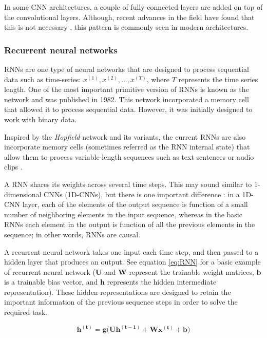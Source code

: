In some CNN architectures, a couple of fully-connected layers are added on top of the convolutional layers. Although, recent advances in the field have found that this is not necessary \autocite{shelhamer2015}, this pattern is commonly seen in modern architectures.


\subsubsection{Recurrent neural networks}
\sloppy RNNs are one type of neural networks that are designed to process sequential data such as time-series: $x^{(1)}, x^{(2)}, ..., x^{(T)}$, where $T$ represents the time series length. One of the most important primitive version of RNNs is known as the \citet{hopfield1982} network and was published in 1982. This network incorporated a memory cell that allowed it to process sequential data. However, it was initially designed to work with binary data.

Inspired by the \textit{Hopfield} network and its variants, the current RNNs are also incorporate memory cells (sometimes referred as the RNN internal state) that allow them to process variable-length sequences such as text sentences or audio clips \autocite{haykin1998}.

A RNN shares its weights across several time steps. This may sound similar to 1-dimensional CNNs (1D-CNNs), but there is one important difference \autocite{Goodfellow2016}: in a 1D-CNN layer, each of the elements of the output sequence is function of a small number of neighboring elements in the input sequence, whereas in the basic RNNs each element in the output is function of all the previous elements in the sequence; in other words, RNNs are causal. 

A recurrent neural network takes one input each time step, and then passed to a hidden layer that produces an output. See equation \ref{eq:RNN} for a basic example of recurrent neural network ($\mathbf{U}$ and $\mathbf{W}$ represent the trainable weight matrices, $\mathbf{b}$ is a trainable bias vector, and $\mathbf{h}$ represents the hidden intermediate representation). These hidden representations are designed to retain the important information of the previous sequence steps in order to solve the required task.

\begin{equation}
\label{eq:RNN}
\mathbf{h^{( t )}} = \mathbf{g(U h^{( t-1 )}} + \mathbf{W x^{( t )}} + \mathbf{b})
\end{equation}

